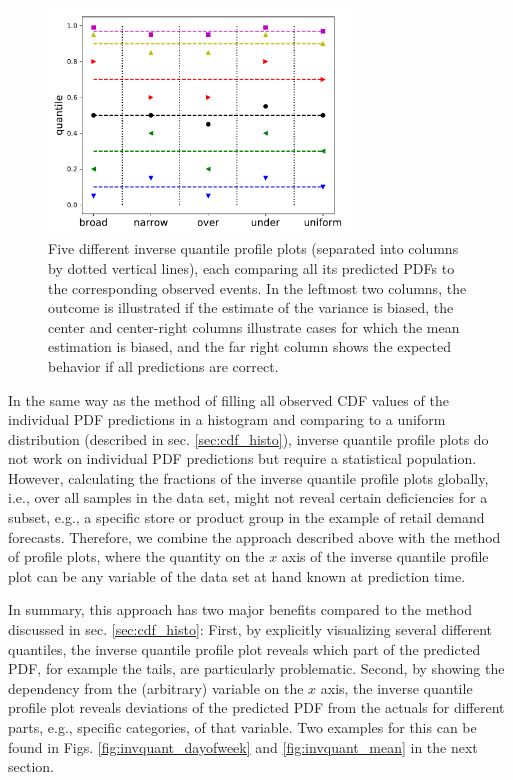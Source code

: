 \documentclass[BCOR=1mm, DIV=calc,10pt,
twoside=true,
twocolumn,
headings=normal]{scrartcl}
\begin{document}
\begin{figure}
\begin{center}
\includegraphics[width=8cm]{figs/invquant_example}
\caption{\label{fig:invquant_example} Five different inverse quantile profile plots (separated into columns by dotted vertical lines), each comparing all its predicted PDFs to the corresponding observed events. In the leftmost two columns, the outcome is illustrated if the estimate of the variance is biased, the center and center-right columns illustrate cases for which the mean estimation is biased, and the far right column shows the expected behavior if all predictions are correct.}
\end{center}
\end{figure}

In the same way as the method of filling all observed CDF values of the individual PDF predictions in a histogram and comparing to a uniform distribution (described in sec. \ref{sec:cdf_histo}), inverse quantile profile plots do not work on individual PDF predictions but require a statistical population. However, calculating the fractions of the inverse quantile profile plots globally, i.e., over all samples in the data set, might not reveal certain deficiencies for a subset, e.g., a specific store or product group in the example of retail demand forecasts. Therefore, we combine the approach described above with the method of profile plots, where the quantity on the $x$ axis of the inverse quantile profile plot can be any variable of the data set at hand known at prediction time.

In summary, this approach has two major benefits compared to the method discussed in sec. \ref{sec:cdf_histo}: First, by explicitly visualizing several different quantiles, the inverse quantile profile plot reveals which part of the predicted PDF, for example the tails, are particularly problematic. Second, by showing the dependency from the (arbitrary) variable on the $x$ axis, the inverse quantile profile plot reveals deviations of the predicted PDF from the actuals for different parts, e.g., specific categories, of that variable. Two examples for this can be found in Figs. \ref{fig:invquant_dayofweek} and \ref{fig:invquant_mean} in the next section.
\end{document}
